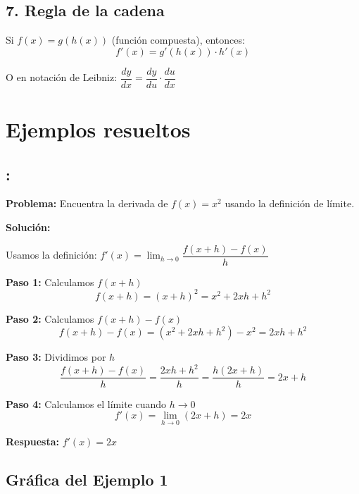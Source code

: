 \documentclass[12pt,a4paper]{article}
\begin{document}
\subsection*{7. Regla de la cadena}

Si $f(x) = g(h(x))$ (función compuesta), entonces:
\[
\boxed{f'(x) = g'(h(x)) \cdot h'(x)}
\]

O en notación de Leibniz: $\dfrac{dy}{dx} = \dfrac{dy}{du} \cdot \dfrac{du}{dx}$

\section{Ejemplos resueltos}

\subsection*{{\color{blue!40!red}{Ejemplo 1}}: \color{blue!80!black}{Derivada usando la definición de límite}}

\textbf{Problema:} Encuentra la derivada de $f(x) = x^2$ usando la definición de límite.

\bigskip

\textbf{Solución:}

Usamos la definición: $f'(x) = \lim_{h \to 0} \dfrac{f(x+h) - f(x)}{h}$

\textbf{Paso 1:} Calculamos $f(x+h)$
\[
f(x+h) = (x+h)^2 = x^2 + 2xh + h^2
\]

\textbf{Paso 2:} Calculamos $f(x+h) - f(x)$
\[
f(x+h) - f(x) = (x^2 + 2xh + h^2) - x^2 = 2xh + h^2
\]

\textbf{Paso 3:} Dividimos por $h$
\[
\frac{f(x+h) - f(x)}{h} = \frac{2xh + h^2}{h} = \frac{h(2x + h)}{h} = 2x + h
\]

\textbf{Paso 4:} Calculamos el límite cuando $h \to 0$
\[
f'(x) = \lim_{h \to 0} (2x + h) = 2x
\]

\textbf{Respuesta:} $\boxed{f'(x) = 2x}$

\subsection*{Gráfica del Ejemplo 1}
\end{document}
